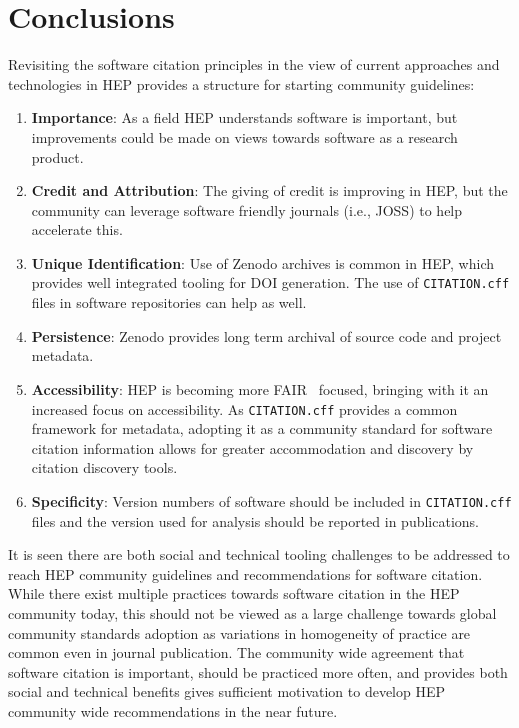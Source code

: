 \section{Conclusions}\label{sec:conclusions}

Revisiting the software citation principles in the view of current approaches and technologies in HEP provides a structure for starting community guidelines:

\begin{enumerate}
    \item \textbf{Importance}: As a field HEP understands software is important, but improvements could be made on views towards software as a research product.
    \item \textbf{Credit and Attribution}: The giving of credit is improving in HEP, but the community can leverage software friendly journals (i.e., JOSS) to help accelerate this.
    \item \textbf{Unique Identification}: Use of Zenodo archives is common in HEP, which provides well integrated tooling for DOI generation.
The use of \texttt{CITATION.cff} files in software repositories can help as well.
    \item \textbf{Persistence}: Zenodo provides long term archival of source code and project metadata.
    \item \textbf{Accessibility}: HEP is becoming more FAIR~\cite{wilkinson_fair_2016,chue_hong_neil_p_2022_6623556} focused, bringing with it an increased focus on accessibility.
As \texttt{CITATION.cff} provides a common framework for metadata, adopting it as a community standard for software citation information allows for greater accommodation and discovery by citation discovery tools.
    \item \textbf{Specificity}: Version numbers of software should be included in \texttt{CITATION.cff} files and the version used for analysis should be reported in publications.
\end{enumerate}

It is seen there are both social and technical tooling challenges to be addressed to reach HEP community guidelines and recommendations for software citation.
While there exist multiple practices towards software citation in the HEP community today, this should not be viewed as a large challenge towards global community standards adoption as variations in homogeneity of practice are common even in journal publication.
The community wide agreement that software citation is important, should be practiced more often, and provides both social and technical benefits gives sufficient motivation to develop HEP community wide recommendations in the near future.
